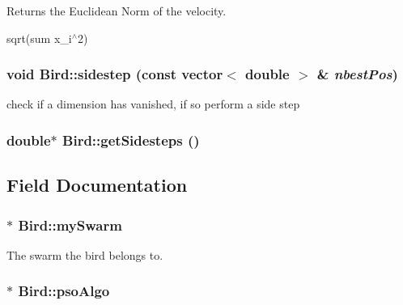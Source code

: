 Returns the Euclidean Norm of the velocity. 

sqrt(sum x\_\-i$^\wedge$2) \hypertarget{classBird_f93673932c41319e7488cb6f5e509ddc}{
\subsubsection{\setlength{\rightskip}{0pt plus 5cm}void Bird::sidestep (const vector$<$ double $>$ \& {\em nbestPos})}}
\label{classBird_f93673932c41319e7488cb6f5e509ddc}


check if a dimension has vanished, if so perform a side step 

\hypertarget{classBird_6ed8acd5fb90432d021ae8b1d7dcb383}{
\subsubsection{\setlength{\rightskip}{0pt plus 5cm}double$\ast$ Bird::getSidesteps ()}}
\label{classBird_6ed8acd5fb90432d021ae8b1d7dcb383}




\subsection{Field Documentation}
\hypertarget{classBird_344bfd3227e0b7ef39eb339b9bc356ac}{
\subsubsection{$\ast$ {\bf Bird::mySwarm}}}
\label{classBird_344bfd3227e0b7ef39eb339b9bc356ac}


The swarm the bird belongs to. 

\hypertarget{classBird_fa9e55bba7454c55a49f30c6638ee758}{
\subsubsection{$\ast$ {\bf Bird::psoAlgo}}}
\label{classBird_fa9e55bba7454c55a49f30c6638ee758}


